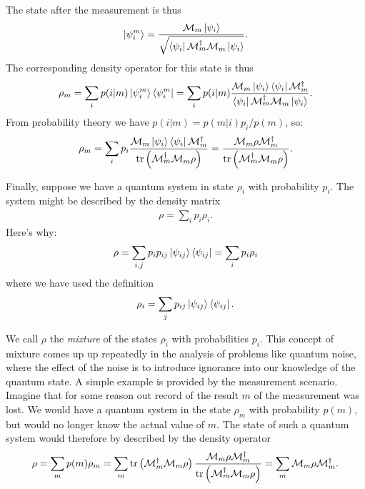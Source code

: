 \documentclass{book}
\theoremstyle{definition}
\newcommand{\M}{\mathcal{M}}
\newcommand{\f}[2]{\frac{#1}{#2}}
\newcommand{\lp}{\left(}
\newcommand{\rp}{\right)}
\begin{document}
The state after the measurement is thus
\begin{align}
\ket{\psi_i^m} = \f{\M_m \ket{\psi_i}}{\sqrt{\bra{\psi_i}\M_m^\dagger \M_m \ket{\psi_i}}}.
\end{align}
The corresponding density operator for this state is thus
\begin{align}
\rho_m = \sum_i p(i|m)\ket{\psi_i^m}\bra{\psi_i^m} = \sum_i p(i|m)\f{\M_m \ket{\psi_i}\bra{\psi_i}\M_m^\dagger}{\bra{\psi_i}\M_m^\dagger \M_m \ket{\psi_i}}.
\end{align}
From probability theory we have $p(i|m) = p(m|i)p_i/p(m)$, so:
\begin{align}
\rho_m = \sum_i p_i \f{\M_m \ket{\psi_i}\bra{\psi_i}\M_m^\dagger}{\tr\lp \M^\dagger_m \M_m \rho \rp} = \f{\M_m \rho \M_m^\dagger}{\tr\lp \M_m^\dagger \M_m \rho \rp}.
\end{align}




Finally, suppose we have a quantum system in state $\rho_i$ with probability $p_i$. The system might be described by the density matrix
\begin{align}
\rho = \sum_i p_i \rho_i.
\end{align}
Here's why:
\begin{align}
\rho = \sum_{i,j}p_i p_{ij}\ket{\psi_{ij}}\bra{\psi_{ij}} = \sum_i p_i \rho_i
\end{align}
where we have used the definition
\begin{align}
\rho_i = \sum_{j}p_{ij}\ket{\psi_{ij}}\bra{\psi_{ij}}.
\end{align}

We call $\rho$ the \textit{mixture} of the states $\rho_i$ with probabilities $p_i$. This concept of mixture comes up up repeatedly in the analysis of problems like quantum noise, where the effect of the noise is to introduce ignorance into our knowledge of the quantum state. A simple example is provided by the measurement scenario. Imagine that for some reason out record of the result $m$ of the measurement was lost. We would have a quantum system in the state $\rho_m$ with probability $p(m)$, but would no longer know the actual value of $m$. The state of such a quantum system would therefore by described by the density operator
\begin{align}
\rho = \sum_m p(m)\rho_m = \sum_m \tr\lp \M_m^\dagger \M_m \rho \rp\f{\M_m \rho \M_m^\dagger}{\tr\lp \M_m^\dagger \M_m \rho \rp} = \sum_m \M_m \rho \M_m^\dagger.
\end{align}
\end{document}
